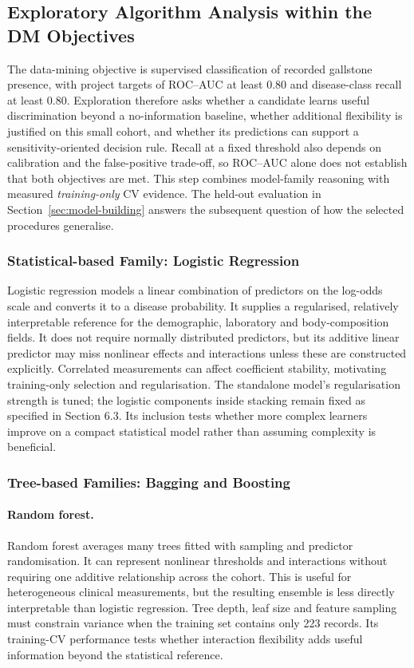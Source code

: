 \subsection{Exploratory Algorithm Analysis within the DM Objectives}
\label{subsec:algorithm-exploration}
The data-mining objective is supervised classification of recorded gallstone presence, with project targets of ROC--AUC at least 0.80 and disease-class recall at least 0.80. Exploration therefore asks whether a candidate learns useful discrimination beyond a no-information baseline, whether additional flexibility is justified on this small cohort, and whether its predictions can support a sensitivity-oriented decision rule. Recall at a fixed threshold also depends on calibration and the false-positive trade-off, so ROC--AUC alone does not establish that both objectives are met. This step combines model-family reasoning with measured \emph{training-only} CV evidence. The held-out evaluation in Section~\ref{sec:model-building} answers the subsequent question of how the selected procedures generalise.

\subsubsection{Statistical-based Family: Logistic Regression}
Logistic regression models a linear combination of predictors on the log-odds scale and converts it to a disease probability. It supplies a regularised, relatively interpretable reference for the demographic, laboratory and body-composition fields. It does not require normally distributed predictors, but its additive linear predictor may miss nonlinear effects and interactions unless these are constructed explicitly. Correlated measurements can affect coefficient stability, motivating training-only selection and regularisation. The standalone model's regularisation strength is tuned; the logistic components inside stacking remain fixed as specified in Section 6.3. Its inclusion tests whether more complex learners improve on a compact statistical model rather than assuming complexity is beneficial.

\subsubsection{Tree-based Families: Bagging and Boosting}
\paragraph{Random forest.} Random forest averages many trees fitted with sampling and predictor randomisation. It can represent nonlinear thresholds and interactions without requiring one additive relationship across the cohort. This is useful for heterogeneous clinical measurements, but the resulting ensemble is less directly interpretable than logistic regression. Tree depth, leaf size and feature sampling must constrain variance when the training set contains only 223 records. Its training-CV performance tests whether interaction flexibility adds useful information beyond the statistical reference.

